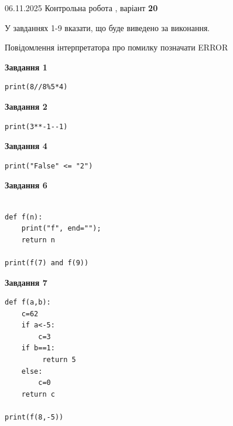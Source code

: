 \documentclass[12pt, ukrainian]{article}
\begin{document}
{\Large{06.11.2025 Контрольна робота , варіант  \No \textbf { 20 }\par}}
{
\begin {large}
У завданнях 1-9 вказати, що буде виведено за виконання.

Повідомлення інтерпретатора про помилку позначати ERROR

\begin{minipage}[t]{7.5cm}

\begin{center}
\textbf{Завдання 1}
\end{center}

\begin{verbatim}
print(8//8%5*4)
\end{verbatim}



\begin{center}
\textbf{Завдання 2}
\end{center}

\begin{verbatim}
print(3**-1--1)
\end{verbatim}



\begin{center}
\textbf{Завдання 4}
\end{center}

\begin{verbatim}
print("False" <= "2")
\end{verbatim}



\begin{center}
\textbf{Завдання 6}
\end{center}

\begin{verbatim}

def f(n):
    print("f", end="");
    return n

print(f(7) and f(9))
\end{verbatim}



\begin{center}
\textbf{Завдання 7}
\end{center}

\begin{verbatim}
def f(a,b):
    c=62
    if a<-5:
        c=3
    if b==1:
         return 5
    else: 
        c=0
    return c

print(f(8,-5))
\end{verbatim}


\end{minipage}
\end{large}}
\end{document}
